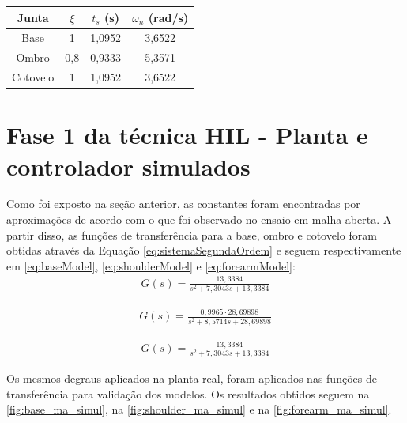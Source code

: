 \begin{center}
    \begin{tabular}{| c | c | c | c |}\hline
      \textbf{Junta}	& $\xi$ 	& $t_s$ (s)	& $\omega_n$ (rad/s)	\\ \hline
      Base		& 1 		& 1,0952	& 3,6522		\\ \hline
      Ombro		& 0,8 		& 0,9333	& 5,3571		\\ \hline
      Cotovelo		& 1 		& 1,0952	& 3,6522		\\ \hline
    \end{tabular}
    \label{tab:ctesModeloMA}
\end{center}

\section{Fase 1 da técnica HIL - Planta e controlador simulados}

Como foi exposto na seção anterior, as constantes foram encontradas por aproximações de acordo
com o que foi observado no ensaio em malha aberta. A partir disso, as funções de transferência
para a base, ombro e cotovelo foram obtidas através da Equação \eqref{eq:sistemaSegundaOrdem} e 
seguem respectivamente em \eqref{eq:baseModel}, \eqref{eq:shoulderModel} e \eqref{eq:forearmModel}:
\begin{equation}
  \begin{gathered}
    G(s) = \frac{13,3384}{s^2 + 7,3043s + 13,3384}
  \end{gathered}
  \label{eq:baseModel}
\end{equation}

\begin{equation}
  \begin{gathered}
    G(s) = \frac{0,9965 \cdot 28,69898}{s^2 + 8,5714s + 28,69898}
  \end{gathered}
  \label{eq:shoulderModel}
\end{equation}

\begin{equation}
  \begin{gathered}
   G(s) = \frac{13,3384}{s^2 + 7,3043s + 13,3384}
  \end{gathered}
  \label{eq:forearmModel}
\end{equation}

Os mesmos degraus aplicados na planta real, foram aplicados nas funções de transferência para
validação dos modelos. Os resultados obtidos seguem na \autoref{fig:base_ma_simul}, na
\autoref{fig:shoulder_ma_simul} e na \autoref{fig:forearm_ma_simul}.

